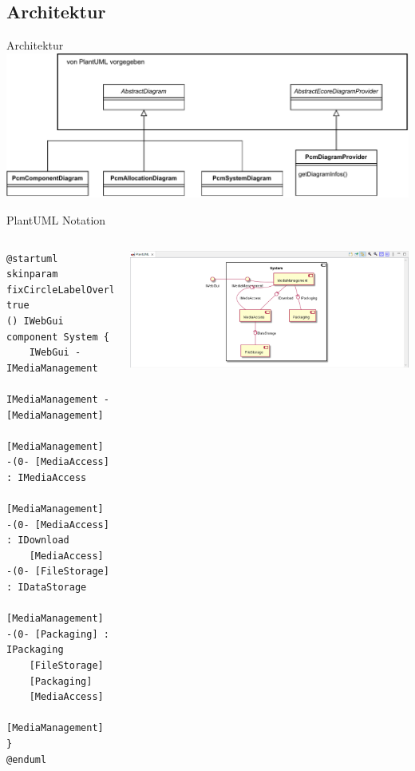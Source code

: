 \documentclass{sdqbeamer}
\begin{document}
\subsection{Architektur}
\begin{frame}{Architektur}
    \includegraphics[width=\textwidth]{klassendiagramm.drawio.pdf}
\end{frame}

\begin{frame}[fragile]{PlantUML Notation}
\begin{columns}
\begin{lstlisting}[basicstyle=\small]
@startuml
skinparam fixCircleLabelOverlapping true
() IWebGui
component System {
    IWebGui - IMediaManagement
    IMediaManagement - [MediaManagement]
    [MediaManagement] -(0- [MediaAccess] : IMediaAccess
    [MediaManagement] -(0- [MediaAccess] : IDownload
    [MediaAccess] -(0- [FileStorage] : IDataStorage
    [MediaManagement] -(0- [Packaging] : IPackaging
    [FileStorage] 
    [Packaging]
    [MediaAccess] 
    [MediaManagement]
}
@enduml
\end{lstlisting}

\includegraphics[width=\textwidth,height=.8\textheight]{system.png}
\end{columns}
\end{frame}
\end{document}
